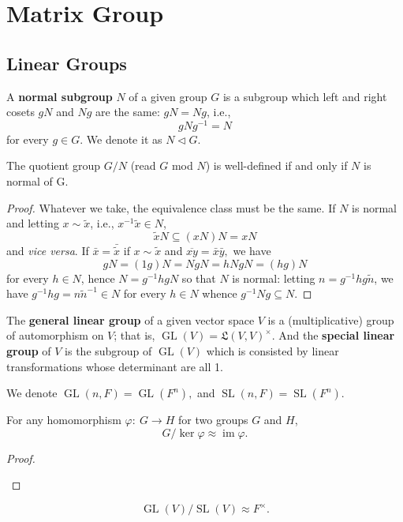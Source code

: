 \chapter{Matrix Group}
\section{Linear Groups}

\begin{defn}
A \textbf{normal subgroup} $N$ of a given group $G$ is a subgroup which left and right cosets $gN$ and $Ng$ are the same: $gN = Ng$, i.e., $$gNg^{-1} = N$$ for every $g\in G.$ We denote it as $N \triangleleft G$.
\end{defn}
\begin{prop} The quotient group $G/N$ (read $G$ mod $N$) is well-defined if and only if $N$ is normal of G.
\end{prop}
\begin{proof}
Whatever we take, the equivalence class must be the same. If $N$ is normal and letting $x\sim \tilde x$, i.e., $x^{-1}\tilde x \in N$, $$\tilde xN \subseteq (xN)N = xN$$ and \textit{vice versa}. If $\bar x = \bar{\tilde x} $ if $x\sim \tilde x$ and $\overline{xy} = \bar x \bar y,$ we have $$gN = (1g)N = NgN = hNgN = (hg)N$$ for every $h\in N$, hence $N = g^{-1} hgN$ so that $N$ is normal: letting $n = g^{-1}hg\tilde{n}$, we have $g^{-1}hg=n\tilde{n}^{-1}\in N$ for every $h\in N$ whence $g^{-1}Ng \subseteq N.$
\end{proof}
\begin{defn} The \textbf{general linear group} of a given vector space $V$ is a (multiplicative) group of automorphism on $V$; that is, $\operatorname{GL}(V) = \mathfrak L(V,V)^\times.$ And the \textbf{special linear group} of $V$ is the subgroup of $\operatorname{GL}(V)$ which is consisted by linear transformations whose determinant are all 1.

We denote $\operatorname{GL}(n, F) = \operatorname{GL}(F^n),$ and $\operatorname{SL}(n, F) = \operatorname{SL}(F^n).$
\end{defn}
\begin{theorem}
For any homomorphism $\varphi:~G\to H$ for two groups $G$ and $H$, $$G/\ker \varphi \approx \operatorname{im} \varphi.$$
\end{theorem}
\begin{proof}
\hfill
\begin{center}
\leavevmode
\xy
{}
\endxy
\end{center}
\end{proof}
\begin{prop}[GL and SL] $$\operatorname{GL}(V)/\operatorname{SL}(V) \approx F^\times.$$
\end{prop}

